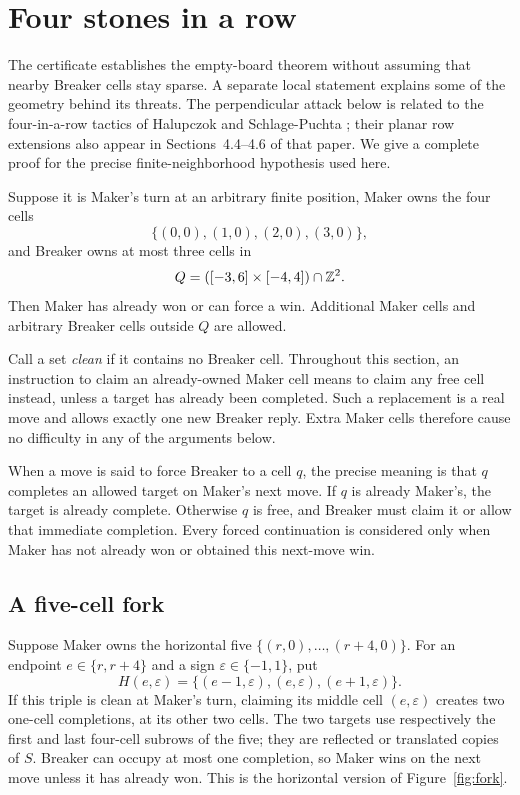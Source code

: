 \section{Four stones in a row}\label{sec:geometry}

The certificate establishes the empty-board theorem without assuming
that nearby Breaker cells stay sparse. A separate local statement
explains some of the geometry behind its threats. The perpendicular
attack below is related to the four-in-a-row tactics of Halupczok
and Schlage-Puchta \cite[Section~3, pp.~13--15]{HSP2007}; their planar
row extensions also appear in Sections~4.4--4.6 of that paper.
We give a complete proof for the precise finite-neighborhood
hypothesis used here.

\begin{proposition}\label{prop:four-row}
Suppose it is Maker's turn at an arbitrary finite position, Maker
owns the four cells
\[
 \{(0,0),(1,0),(2,0),(3,0)\},
\]
and Breaker owns at most three cells in
\[
 Q=([-3,6]\times[-4,4])\cap\mathbb Z^2.
\]
Then Maker has already won or can force a win. Additional Maker
cells and arbitrary Breaker cells outside $Q$ are allowed.
\end{proposition}

Call a set \emph{clean} if it contains no Breaker cell.
Throughout this section, an instruction to claim an already-owned
Maker cell means to claim any free cell instead, unless a target
has already been completed. Such a replacement is a real move and
allows exactly one new Breaker reply. Extra Maker cells therefore
cause no difficulty in any of the arguments below.

When a move is said to force Breaker to a cell $q$, the precise
meaning is that $q$ completes an allowed target on Maker's next
move. If $q$ is already Maker's, the target is already complete.
Otherwise $q$ is free, and Breaker must claim it or allow that
immediate completion. Every forced continuation is considered only
when Maker has not already won or obtained this next-move win.

\subsection{A five-cell fork}

Suppose Maker owns the horizontal five
$\{(r,0),\ldots,(r+4,0)\}$. For an endpoint $e\in\{r,r+4\}$
and a sign $\varepsilon\in\{-1,1\}$, put
\begin{equation}\label{eq:horizontal-triple}
 H(e,\varepsilon)=
 \{(e-1,\varepsilon),(e,\varepsilon),(e+1,\varepsilon)\}.
\end{equation}
If this triple is clean at Maker's turn, claiming its middle cell
$(e,\varepsilon)$ creates two one-cell completions, at its other
two cells. The two targets use respectively the first and last
four-cell subrows of the five; they are reflected or translated
copies of $S$. Breaker can occupy at most one completion, so
Maker wins on the next move unless it has already won.
This is the horizontal version of Figure~\ref{fig:fork}.


